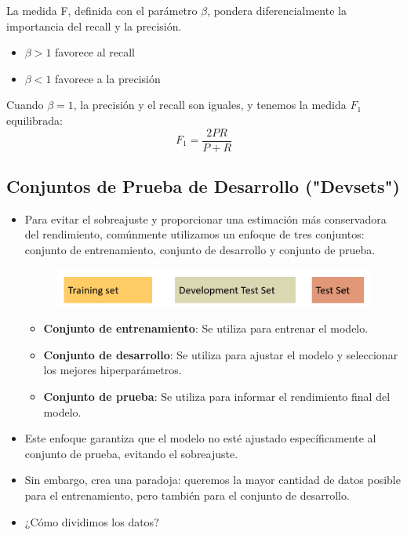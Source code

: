 \documentclass[11pt,fleqn]{book} %
\begin{document}
La medida F, definida con el parámetro $\beta$, pondera diferencialmente la importancia del recall y la precisión.
\begin{itemize}
  \item $\beta > 1$ favorece al recall
  \item $\beta < 1$ favorece a la precisión
\end{itemize}

Cuando $\beta = 1$, la precisión y el recall son iguales, y tenemos la medida $F_1$ equilibrada:
\[
F_1 = \frac{2PR}{P + R}
\]

\subsection{Conjuntos de Prueba de Desarrollo ("Devsets")}

\begin{itemize}
 \item Para evitar el sobreajuste y proporcionar una estimación más conservadora del rendimiento, comúnmente utilizamos un enfoque de tres conjuntos: conjunto de entrenamiento, conjunto de desarrollo y conjunto de prueba.
\begin{figure}[h]
\includegraphics[scale = 0.23]{pics/devsets.png}
\end{figure}

\begin{itemize}
\item \textbf{Conjunto de entrenamiento}: Se utiliza para entrenar el modelo.
\item \textbf{Conjunto de desarrollo}: Se utiliza para ajustar el modelo y seleccionar los mejores hiperparámetros.
\item \textbf{Conjunto de prueba}: Se utiliza para informar el rendimiento final del modelo.
\end{itemize}

\item Este enfoque garantiza que el modelo no esté ajustado específicamente al conjunto de prueba, evitando el sobreajuste.
\item Sin embargo, crea una paradoja: queremos la mayor cantidad de datos posible para el entrenamiento, pero también para el conjunto de desarrollo.
\item ¿Cómo dividimos los datos?

\end{itemize}
\end{document}
